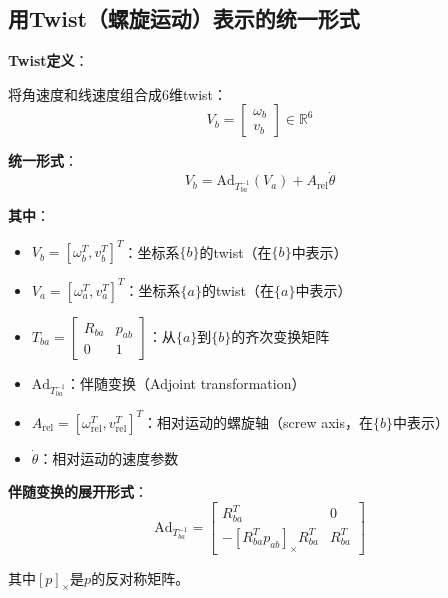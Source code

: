 \documentclass[12pt,a4paper]{article}
\begin{document}
\subsection{用Twist（螺旋运动）表示的统一形式}

\textbf{Twist定义}：

将角速度和线速度组合成6维twist：
\begin{equation}
V_b = \begin{bmatrix} \omega_b \\ v_b \end{bmatrix} \in \mathbb{R}^6
\end{equation}

\textbf{统一形式}：
\begin{equation}
V_b = \text{Ad}_{T_{ba}^{-1}}(V_a) + A_{\text{rel}} \dot{\theta} \tag{统一形式}
\end{equation}

\textbf{其中}：
\begin{itemize}
\item $V_b = [\omega_b^T, v_b^T]^T$：坐标系$\{b\}$的twist（在$\{b\}$中表示）
\item $V_a = [\omega_a^T, v_a^T]^T$：坐标系$\{a\}$的twist（在$\{a\}$中表示）
\item $T_{ba} = \begin{bmatrix} R_{ba} & p_{ab} \\ 0 & 1 \end{bmatrix}$：从$\{a\}$到$\{b\}$的齐次变换矩阵
\item $\text{Ad}_{T_{ba}^{-1}}$：伴随变换（Adjoint transformation）
\item $A_{\text{rel}} = [\omega_{\text{rel}}^T, v_{\text{rel}}^T]^T$：相对运动的螺旋轴（screw axis，在$\{b\}$中表示）
\item $\dot{\theta}$：相对运动的速度参数
\end{itemize}

\textbf{伴随变换的展开形式}：
\begin{equation}
\text{Ad}_{T_{ba}^{-1}} = \begin{bmatrix}
R_{ba}^T & 0 \\
-[R_{ba}^T p_{ab}]_{\times} R_{ba}^T & R_{ba}^T
\end{bmatrix}
\end{equation}

其中$[p]_{\times}$是$p$的反对称矩阵。
\end{document}
